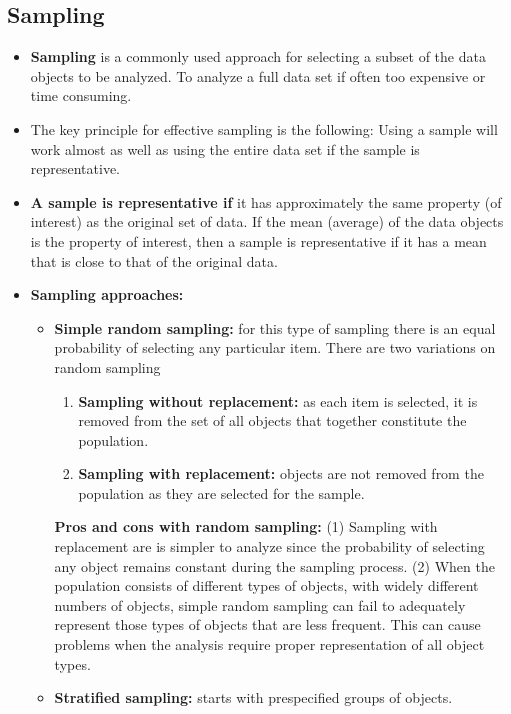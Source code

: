 	\subsection{Sampling}
		\begin{itemize}
			\item {\bf Sampling} is a commonly used approach for selecting a subset of the data 
			objects to be analyzed. To analyze a full data set if often too expensive or 
			time consuming. 
			\item The key principle for effective sampling is the following: Using a sample
			will work almost as well as using the entire data set if the sample is 
			representative.
			\item {\bf A sample is representative if} it has approximately the same property 
			(of interest) as the original set of data. If the mean (average) of the data
			objects is the property of interest, then a sample is representative if it has
			a mean that is close to that of the original data. 
			\item {\bf Sampling approaches:}
				\begin{itemize}
					\item {\bf Simple random sampling: } for this type of sampling there is 
					an equal probability of selecting any particular item. There are two 
					variations on random sampling
						\begin{enumerate}
							\item {\bf Sampling without replacement:} as each item is selected, it is
							removed from the set of all objects that together constitute the
							population. 
							\item {\bf Sampling with replacement:} objects are not removed from 
							the population as they are selected for the sample. 
						\end{enumerate}
					{\bf Pros and cons with random sampling:}  
					(1) Sampling with replacement are is simpler to analyze since the probability 
					of selecting any object remains constant during the sampling process. 
					(2) When the population consists of different types of objects, with widely
					different numbers of objects, simple random sampling can fail to adequately
					represent those types of objects that are less frequent. This can cause
					problems when the analysis require proper representation of all object types.
					\item {\bf Stratified sampling:} starts with prespecified groups of objects.
						\begin{enumerate}

\end{enumerate}
\end{itemize}
\end{itemize}
